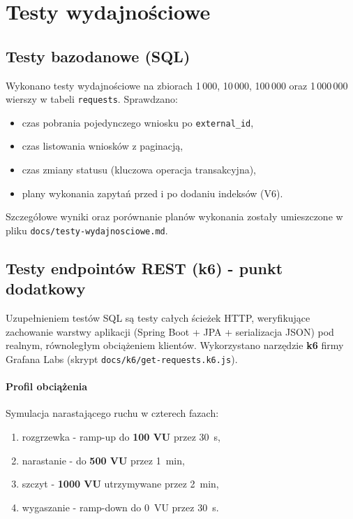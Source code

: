 \documentclass[12pt,a4paper]{article}
\begin{document}
\section{Testy wydajnościowe}
\label{sec:wydajnosc}

\subsection{Testy bazodanowe (SQL)}
Wykonano testy wydajnościowe na zbiorach 1\,000, 10\,000, 100\,000 oraz
1\,000\,000 wierszy w tabeli \texttt{requests}. Sprawdzano:
\begin{itemize}[leftmargin=*]
  \item czas pobrania pojedynczego wniosku po \texttt{external\_id},
  \item czas listowania wniosków z paginacją,
  \item czas zmiany statusu (kluczowa operacja transakcyjna),
  \item plany wykonania zapytań przed i po dodaniu indeksów (V6).
\end{itemize}

Szczegółowe wyniki oraz porównanie planów wykonania zostały umieszczone w pliku
\texttt{docs/testy-wydajnosciowe.md}.

\subsection{Testy endpointów REST (k6) - punkt dodatkowy}
Uzupełnieniem testów SQL są testy całych ścieżek HTTP, weryfikujące zachowanie
warstwy aplikacji (Spring Boot + JPA + serializacja JSON) pod realnym,
równoległym obciążeniem klientów. Wykorzystano narzędzie \textbf{k6} firmy
Grafana Labs (skrypt \texttt{docs/k6/get-requests.k6.js}).

\paragraph{Profil obciążenia}
Symulacja narastającego ruchu w czterech fazach:
\begin{enumerate}[leftmargin=*]
  \item rozgrzewka - ramp-up do \textbf{100 VU} przez 30~s,
  \item narastanie - do \textbf{500 VU} przez 1~min,
  \item szczyt - \textbf{1000 VU} utrzymywane przez 2~min,
  \item wygaszanie - ramp-down do 0~VU przez 30~s.
\end{enumerate}
\end{document}
